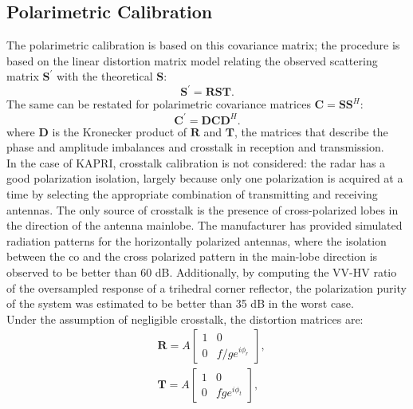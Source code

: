\subsection{Polarimetric Calibration}\label{sec:methods:proc_polcal}
The polarimetric calibration is based on this covariance matrix;
the procedure is based on the linear distortion matrix model\cite{Saraband1990, Sarabandi1992a} relating the observed scattering matrix $\mathbf{S}^\prime$ with the theoretical $\mathbf{S}$:
\begin{equation}\label{eq:distorsion_scattering}
	\mathbf{S}^\prime = \mathbf{R} \mathbf{S} \mathbf{T}.
\end{equation}
The same can be restated for polarimetric covariance matrices $\mathbf{C} = \mathbf{S}\mathbf{S}^H$:
\begin{equation}\label{eq:covariance_distortion}
	\mathbf{C}^\prime = \mathbf{D} \mathbf{C} \mathbf{D}^{H}.
\end{equation}
where $\mathbf{D}$ is the Kronecker product of $\mathbf{R}$ and $\mathbf{T}$, the matrices that describe the phase and amplitude imbalances and crosstalk in reception and transmission.\\
In the case of KAPRI, crosstalk calibration is not considered: the radar has a good polarization isolation, largely because only one polarization is acquired at a time by selecting the appropriate combination of transmitting and receiving antennas. The only source of crosstalk is the presence of cross-polarized lobes in the direction of the antenna mainlobe. The manufacturer has provided simulated radiation patterns for the horizontally polarized antennas, where the isolation between the co and the cross polarized pattern in the main-lobe direction is observed to be better than 60 dB. Additionally, by computing the VV-HV ratio of the oversampled response of a trihedral corner reflector, the polarization purity of the system was estimated to be better than 35 dB in the worst case.\\
Under the assumption of negligible crosstalk, the distortion matrices are:
\begin{equation}
	\begin{aligned}
	&\mathbf{R} = A \begin{bmatrix}
		1 & 0\\
		0 & f/g e^{i\phi_{r}}
	\end{bmatrix},\\
	&\mathbf{T} = A \begin{bmatrix}
			1 & 0\\
			0 & f g e^{i\phi_{t}}
		\end{bmatrix},
	\end{aligned}
\end{equation}
